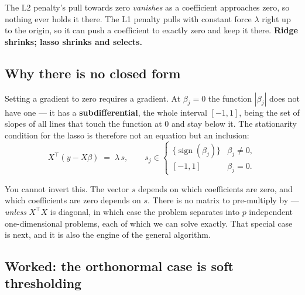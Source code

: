 \documentclass[11pt]{article}
\newcommand{\XtX}{X^{\!\top}\!X}
\begin{document}
\begin{keyidea}
The L2 penalty's pull towards zero \emph{vanishes} as a coefficient
approaches zero, so nothing ever holds it there. The L1 penalty pulls with
constant force $\lambda$ right up to the origin, so it can push a coefficient
to exactly zero and keep it there. \textbf{Ridge shrinks; lasso shrinks and
selects.}
\end{keyidea}

\subsection{Why there is no closed form}
\label{sec:noclosed}

Setting a gradient to zero requires a gradient. At $\beta_j = 0$ the function
$|\beta_j|$ does not have one --- it has a \textbf{subdifferential}, the whole
interval $[-1, 1]$, being the set of slopes of all lines that touch the
function at $0$ and stay below it. The stationarity condition for the lasso is
therefore not an equation but an inclusion:
\begin{equation}
  X^{\!\top}(y - X\beta) \;=\; \lambda\,s,
  \qquad
  s_j \in
  \begin{cases}
    \{\operatorname{sign}(\beta_j)\} & \beta_j \ne 0,\\
    [-1, 1] & \beta_j = 0 .
  \end{cases}
  \label{eq:kkt}
\end{equation}

You cannot invert this. The vector $s$ depends on which coefficients are zero,
and which coefficients are zero depends on $s$. There is no matrix to
pre-multiply by --- \emph{unless} $\XtX$ is diagonal, in which case the
problem separates into $p$ independent one-dimensional problems, each of which
we can solve exactly. That special case is next, and it is also the engine of
the general algorithm.

\subsection{Worked: the orthonormal case is soft thresholding}
\label{sec:soft}
\end{document}
